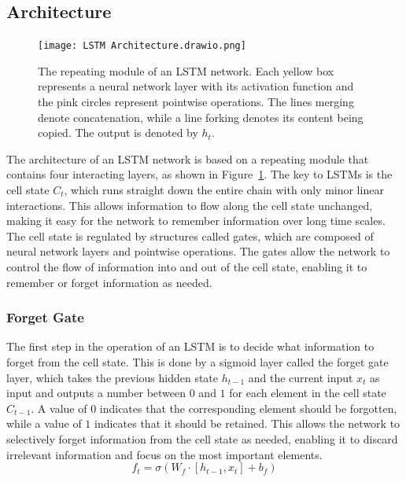 \documentclass{article}
\newcommand{\reffig}[1]{Figure~\ref{#1}}
\begin{document}
\subsection{Architecture}
\label{sec:3.0}

\begin{figure}
  \centering
  \texttt{[image: LSTM Architecture.drawio.png]}
  \caption{The repeating module of an LSTM network. Each yellow box represents a neural
    network layer with its activation function and the pink circles represent pointwise
    operations. The lines merging denote concatenation, while a line forking denotes its
    content being copied. The output is denoted by $h_t$.}
  \label{fig:lstm}
\end{figure}

The architecture of an LSTM network is based on a repeating module that contains four
interacting layers, as shown in \reffig{fig:lstm}. The key to LSTMs is the cell state
$C_t$, which runs straight down the entire chain with only minor linear interactions. This
allows information to flow along the cell state unchanged, making it easy for the network
to remember information over long time scales. The cell state is regulated by structures
called gates, which are composed of neural network layers and pointwise operations. The
gates allow the network to control the flow of information into and out of the cell state,
enabling it to remember or forget information as needed.


\subsubsection{Forget Gate}
\label{sec:3.0.0}

The first step in the operation of an LSTM is to decide what information to forget from
the cell state. This is done by a sigmoid layer called the forget gate layer, which takes
the previous hidden state $h_{t-1}$ and the current input $x_t$ as input and outputs a
number between $0$ and $1$ for each element in the cell state $C_{t-1}$. A value of $0$
indicates that the corresponding element should be forgotten, while a value of $1$
indicates that it should be retained. This allows the network to selectively forget
information from the cell state as needed, enabling it to discard irrelevant information
and focus on the most important elements.
\begin{equation}
  f_t = \sigma(W_f \cdot [h_{t-1}, x_t] + b_f)
\end{equation}
\end{document}
